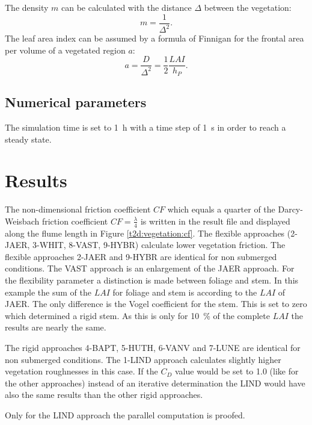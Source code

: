 The density $m$ can be calculated with the distance $\Delta$ between the vegetation: 
\begin{equation}
m = \frac{1}{\Delta^2} .
\end{equation}
The leaf area index can be assumed by a formula of Finnigan \cite{finnigan2000}
for the frontal area per volume of a vegetated region $a$:
\begin{equation}
a = \frac{D}{\Delta^2} = \frac{1}{2} \frac{LAI}{h_P}.
\end{equation}

\subsection{Numerical parameters}

The simulation time is set to 1~h with a time step of 1~s in order to reach a steady state. 

\section{Results}

The non-dimensional friction coefficient $CF$ which equals a quarter of the
Darcy-Weisbach friction coefficient $CF = \frac{\lambda}{4}$ is written in the
result file and displayed along the flume length in Figure \ref{t2d:vegetation:cf}. 
The flexible approaches (2-JAER, 3-WHIT, 8-VAST, 9-HYBR) calculate lower vegetation friction. 
The flexible approaches 2-JAER and 9-HYBR are identical for non
submerged conditions.
The VAST approach is an enlargement of the JAER approach.
For the flexibility parameter a distinction is made between foliage and stem.
In this example the sum of the $LAI$ for foliage and stem is according to the
$LAI$ of JAER.
The only difference is the Vogel coefficient for the stem.
This is set to zero which determined a rigid stem.
As this is only for 10~\% of the complete $LAI$ the results are nearly the same.
\newline

The rigid approaches 4-BAPT, 5-HUTH, 6-VANV and 7-LUNE are identical for non
submerged conditions.
The 1-LIND approach calculates slightly higher vegetation roughnesses in this case.
If the $C_D$ value would be set to 1.0 (like for the other approaches) instead
of an iterative determination the LIND would have also the same results than
the other rigid approaches.

Only for the LIND approach the parallel computation is proofed.

